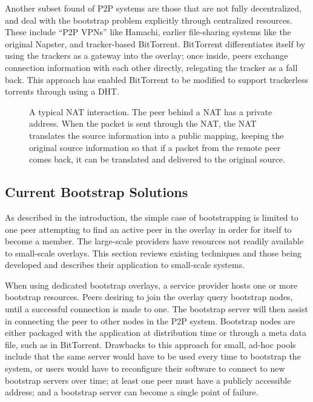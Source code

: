 \documentclass[conference]{IEEEtran}
\begin{document}
Another subset found of P2P systems are those that are not fully decentralized,
and deal with the bootstrap problem explicitly through centralized resources.
These include ``P2P VPNs'' like Hamachi, earlier file-sharing systems like the
original Napster, and tracker-based BitTorrent.  BitTorrent differentiates
itself by using the trackers as a gateway into the overlay; once inside, peers
exchange connection information with each other directly, relegating the
tracker as a fall back.  This approach has enabled BitTorrent to be modified to
support trackerless torrents through using a DHT.

\begin{figure*}[h!t!]
\centering
{}
\caption{A typical NAT interaction. The peer behind a NAT has a private address.
When the packet is sent through the NAT, the NAT translates the source information
into a public mapping, keeping the original source information so that if a
packet from the remote peer comes back, it can be translated and delivered to
the original source.}
\label{fig:nat}
\end{figure*}

\subsection{Current Bootstrap Solutions}

As described in the introduction, the simple case of bootstrapping is limited
to one peer attempting to find an active peer in the overlay in order for
itself to become a member.  The large-scale providers have resources not
readily available to small-scale overlays.  This section reviews existing
techniques and those being developed and describes their application to
small-scale systems.

When using dedicated bootstrap overlays, a service provider hosts one or more
bootstrap resources.  Peers desiring to join the overlay query bootstrap nodes,
until a successful connection is made to one.  The bootstrap server will then
assist in connecting the peer to other nodes in the P2P system.  Bootstrap
nodes are either packaged with the application at distribution time or through
a meta data file, such as in BitTorrent.  Drawbacks to this approach for small,
ad-hoc pools include that the same server would have to be used every time to
bootstrap the system, or users would have to reconfigure their software to
connect to new bootstrap servers over time; at least one peer must have a
publicly accessible address; and a bootstrap server can become a single point
of failure.
\end{document}
